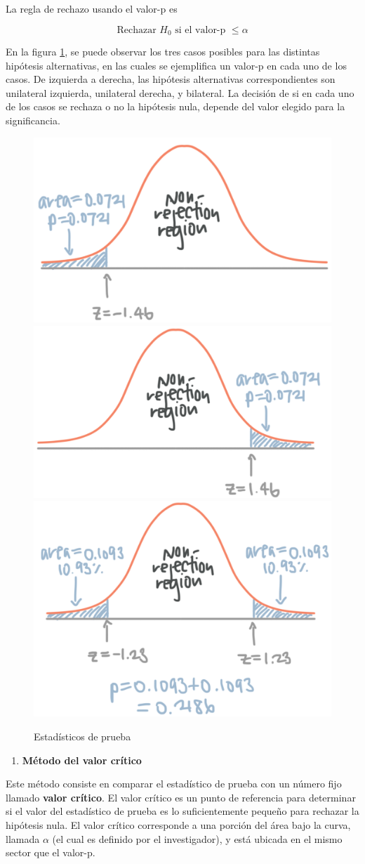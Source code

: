 \documentclass[
]{book}
\providecommand{\tightlist}{%
  \setlength{\itemsep}{0pt}\setlength{\parskip}{0pt}}
\theoremstyle{definition}
\theoremstyle{definition}
\theoremstyle{definition}
\theoremstyle{definition}
\theoremstyle{remark}
\begin{document}
La regla de rechazo usando el valor-p es

\[\text{Rechazar } H_0 \text{ si el valor-p } \leq \alpha\]

En la figura \ref{fig:regiones3}, se puede observar los tres casos posibles para las distintas hipótesis alternativas, en las cuales se ejemplifica un valor-p en cada uno de los casos. De izquierda a derecha, las hipótesis alternativas correspondientes son unilateral izquierda, unilateral derecha, y bilateral. La decisión de si en cada uno de los casos se rechaza o no la hipótesis nula, depende del valor elegido para la significancia.

\begin{figure}

{\centering \includegraphics[width=0.3\linewidth]{img/R1} \includegraphics[width=0.3\linewidth]{img/R2} \includegraphics[width=0.3\linewidth]{img/R3} 

}

\caption{Estadísticos de prueba}\label{fig:regiones3}
\end{figure}

\begin{enumerate}
\def\labelenumi{\arabic{enumi}.}
\setcounter{enumi}{1}
\tightlist
\item
  \textbf{Método del valor crítico}
\end{enumerate}

Este método consiste en comparar el estadístico de prueba con un número fijo llamado \textbf{valor crítico}. El valor crítico es un punto de referencia para determinar si el valor del estadístico de prueba es lo suficientemente pequeño para rechazar la hipótesis nula. El valor
crítico corresponde a una porción del área bajo la curva, llamada \(\alpha\) (el cual es definido por el investigador), y está ubicada en el mismo sector que el valor-p.~
\end{document}
